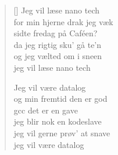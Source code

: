 \begin{multicols}
\begin{verse}[\versewidth]
Jeg vil læse nano tech\\
for min hjerne drak jeg væk\\
sidte fredag på Caféen?\\
da jeg rigtig sku' gå te'n\\
og jeg vælted om i sneen\\
jeg vil læse nano tech


Jeg vil være datalog\\
og min fremtid den er god\\
gcc det er en gave\\
jeg blir nok en kodeslave\\
jeg vil gerne prøv' at snave\\
jeg vil være datalog
\end{verse}
\end{multicols}
\newpage

